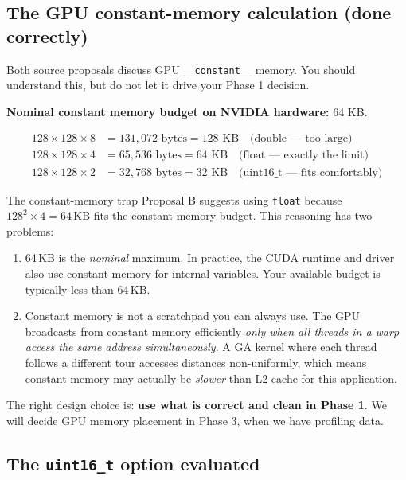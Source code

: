 \subsection{The GPU constant-memory calculation (done correctly)}

Both source proposals discuss GPU \texttt{\_\_constant\_\_} memory. You should understand this, but do not let it drive your Phase 1 decision.

\textbf{Nominal constant memory budget on NVIDIA hardware:} 64 KB.

\begin{align*}
128 \times 128 \times 8 &= 131{,}072 \text{ bytes} = 128 \text{ KB} \quad \text{(double --- too large)} \\
128 \times 128 \times 4 &= 65{,}536 \text{ bytes} = 64 \text{ KB} \quad \text{(float --- exactly the limit)} \\
128 \times 128 \times 2 &= 32{,}768 \text{ bytes} = 32 \text{ KB} \quad \text{(uint16\_t --- fits comfortably)}
\end{align*}

\begin{warning}{The constant-memory trap}
Proposal B suggests using \texttt{float} because $128^2 \times 4 = 64$\,KB fits the constant memory budget. This reasoning has two problems:

\begin{enumerate}[label=\arabic*.]
  \item 64\,KB is the \emph{nominal} maximum. In practice, the CUDA runtime and driver also use constant memory for internal variables. Your available budget is typically less than 64\,KB.
  \item Constant memory is not a scratchpad you can always use. The GPU broadcasts from constant memory efficiently \emph{only when all threads in a warp access the same address simultaneously}. A GA kernel where each thread follows a different tour accesses distances non-uniformly, which means constant memory may actually be \emph{slower} than L2 cache for this application.
\end{enumerate}

The right design choice is: \textbf{use what is correct and clean in Phase 1}. We will decide GPU memory placement in Phase 3, when we have profiling data.
\end{warning}

\subsection{The \texttt{uint16\_t} option evaluated}

